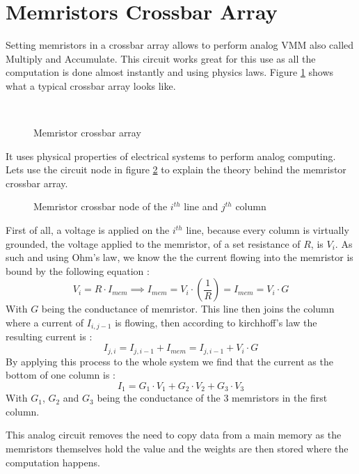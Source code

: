 \section{Memristors Crossbar Array}\label{sec:crossbar}

Setting memristors in a crossbar array allows to perform analog \ac{VMM} also called Multiply and Accumulate. This circuit works great for this use as all the computation is done almost instantly and using physics laws. Figure \ref{fig:crossbar} shows what a typical crossbar array looks like.

\begin{figure}[H]
  \centering
  \subfloat[Schematics]{}%
  \hfill
  \\
  \caption{Memristor crossbar array}
  \label{fig:crossbar}
\end{figure}

It uses physical properties of electrical systems to perform analog computing. Lets use the circuit node in figure \ref{fig:crossNode} to explain the theory behind the memristor crossbar array.
\begin{figure}[H]
  \centering
  
  \caption{Memristor crossbar node of the $i^{th}$ line and $j^{th}$ column}
  \label{fig:crossNode}
\end{figure}

First of all, a voltage is applied on the $i^{th}$ line, because every column is virtually grounded, the voltage applied to the memristor, of a set resistance of $R$, is $V_i$. As such and using Ohm's law, we know the the current flowing into the memristor is bound by the following equation :
\begin{equation}
  V_i = R\cdot I_{mem} \implies I_{mem} = V_i\cdot (\frac{1}{R})=I_{mem} = V_i\cdot G
\end{equation}
With $G$ being the conductance of memristor.
This line then joins the column where a current of $I_{i,j-1}$ is flowing, then according to kirchhoff's law the resulting current is :
\begin{equation}
  I_{j,i} = I_{j,i-1}+I_{mem} = I_{j,i-1} + V_i\cdot G
\end{equation}
By applying this process to the whole system we find that the current as the bottom of one column is :
\begin{equation}
  I_1=G_1\cdot V_1 + G_2\cdot V_2 + G_3\cdot V_3
\end{equation}
With $G_1$, $G_2$ and $G_3$ being the conductance of the 3 memristors in the first column.

This analog circuit removes the need to copy data from a main memory as the memristors themselves hold the value and the weights are then stored where the computation happens.
